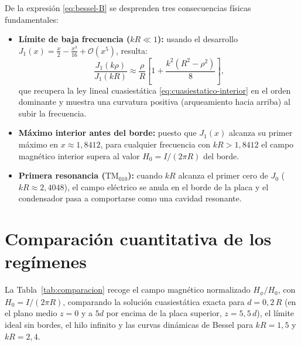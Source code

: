 \documentclass[11pt]{article}
\begin{document}
De la expresión \eqref{eq:bessel-B} se desprenden tres consecuencias físicas fundamentales:
\begin{itemize}
    \item \textbf{Límite de baja frecuencia ($kR \ll 1$):} usando el desarrollo $J_1(x) = \frac{x}{2} - \frac{x^3}{16} + \mathcal{O}(x^5)$, resulta:
    \begin{equation}
        \frac{J_1(k\rho)}{J_1(kR)} \approx \frac{\rho}{R} \left[ 1 + \frac{k^2(R^2 - \rho^2)}{8} \right],
    \end{equation}
    que recupera la ley lineal cuasiestática \eqref{eq:cuasiestatico-interior} en el orden dominante y muestra una curvatura positiva (arqueamiento hacia arriba) al subir la frecuencia.
    \item \textbf{Máximo interior antes del borde:} puesto que $J_1(x)$ alcanza su primer máximo en $x \approx 1{,}8412$, para cualquier frecuencia con $kR > 1{,}8412$ el campo magnético interior supera al valor $H_0 = I/(2\pi R)$ del borde.
    \item \textbf{Primera resonancia ($\mathrm{TM}_{010}$):} cuando $kR$ alcanza el primer cero de $J_0$ ($kR \approx 2{,}4048$), el campo eléctrico se anula en el borde de la placa y el condensador pasa a comportarse como una cavidad resonante.
\end{itemize}

\section{Comparación cuantitativa de los regímenes}

La Tabla~\ref{tab:comparacion} recoge el campo magnético normalizado $H_\phi / H_0$, con $H_0 = I / (2\pi R)$, comparando la solución cuasiestática exacta para $d = 0{,}2\,R$ (en el plano medio $z = 0$ y a $5d$ por encima de la placa superior, $z = 5{,}5\,d$), el límite ideal sin bordes, el hilo infinito y las curvas dinámicas de Bessel para $kR = 1{,}5$ y $kR = 2{,}4$.
\end{document}
